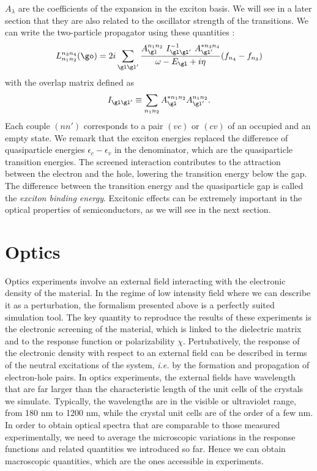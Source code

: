 $A_\lambda$ are the coefficients of the expansion in the exciton basis. We will see in a later section that they are also related to the oscillator strength of the transitions. We can write the two-particle propagator using these quantities :
\begin{equation}
	L^{n_3n_4}_{n_1n_2}(\go) = 2i \sum_{\gl\gl'}\frac{A^{n_1n_2}_\gl \ I^{-1}_{\gl\gl'} \ A^{*n_3n_4}_{\gl'}}{\omega - E_\gl + i\eta} (f_{n_4} - f_{n_3})
\end{equation}
with the overlap matrix defined as 
\begin{equation}
	I_{\gl\gl'} \equiv \sum_{n_1n_2} A^{*n_1n_2}_{\gl} A^{n_1n_2}_{\gl'}.
\end{equation}
Each couple $(nn')$ corresponds to a pair $(vc)$ or $(cv)$ of an occupied and an empty state. We remark that the exciton energies replaced the difference of quasiparticle energies $\epsilon_c - \epsilon_v$ in the denominator, which are the quasiparticle transition energies. The screened interaction contributes to the attraction between the electron and the hole, lowering the transition energy below the gap. The difference between the transition energy and the quasiparticle gap is called the \textit{exciton binding energy}. Excitonic effects can be extremely important in the optical properties of semiconductors, as we will see in the next section.
%

%
\section{Optics}
Optics experiments involve an external field interacting with the electronic density of the material. In the regime of low intensity field where we can describe it as a perturbation, the formalism presented above is a perfectly suited simulation tool. The key quantity to reproduce the results of these experiments is the electronic screening of the material, which is linked to the dielectric matrix and to the response function or polarizability $\chi$. Pertubatively, the response of the electronic density with respect to an external field can be described in terms of the neutral excitations of the system, \textit{i.e.} by the formation and propagation of electron-hole pairs.
In optics experiments, the external fields have wavelength that are far larger than the characteristic length of the unit cells of the crystals we simulate. Typically, the wavelengths are in the visible or ultraviolet range, from 180 nm to 1200 nm, while the crystal unit cells are of the order of a few nm. 
In order to obtain optical spectra that are comparable to those measured experimentally, we need to average the microscopic variations in the response functions and related quantities we introduced so far. Hence we can obtain macroscopic quantities, which are the ones accessible in experiments. 

